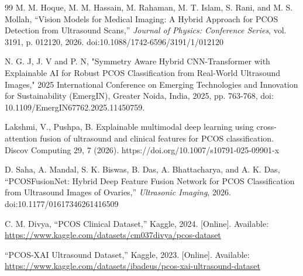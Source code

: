 \documentclass[conference]{IEEEtran}
\begin{document}
\begin{thebibliography}{99}
M. M. Hoque, M. M. Hassain, M. Rahaman, M. T. Islam, S. Rani, and M. S. Mollah, ``Vision Models for Medical Imaging: A Hybrid Approach for PCOS Detection from Ultrasound Scans,'' \textit{Journal of Physics: Conference Series}, vol. 3191, p. 012120, 2026. doi:10.1088/1742-6596/3191/1/012120

N. G. J, J. V and P. N, "Symmetry Aware Hybrid CNN-Transformer with Explainable AI for Robust PCOS Classification from Real-World Ultrasound Images," 2025 International Conference on Emerging Technologies and Innovation for Sustainability (EmergIN), Greater Noida, India, 2025, pp. 763-768, doi: 10.1109/EmergIN67762.2025.11450759.

Lakshmi, V., Pushpa, B. Explainable multimodal deep learning using cross-attention fusion of ultrasound and clinical features for PCOS classification. Discov Computing 29, 7 (2026). https://doi.org/10.1007/s10791-025-09901-x

D. Saha, A. Mandal, S. K. Biswas, B. Das, A. Bhattacharya, and A. K. Das, ``PCOSFusionNet: Hybrid Deep Feature Fusion Network for PCOS Classification from Ultrasound Images of Ovaries,'' \textit{Ultrasonic Imaging}, 2026. doi:10.1177/01617346261416509

C. M. Divya, ``PCOS Clinical Dataset,'' Kaggle, 2024. [Online]. Available: \url{https://www.kaggle.com/datasets/cm037divya/pcos-dataset}

``PCOS-XAI Ultrasound Dataset,'' Kaggle, 2023. [Online]. Available: \url{https://www.kaggle.com/datasets/ibadeus/pcos-xai-ultrasound-dataset}

\end{thebibliography}
\end{document}
